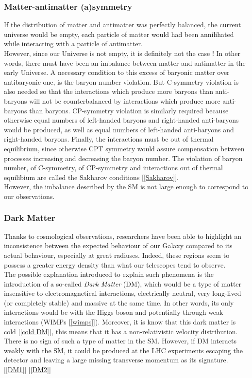 \documentclass [12pt] {article}
\numberwithin{equation}{section} %
\numberwithin{figure}{section}   %
\begin{document}
\subsubsection*{Matter-antimatter (a)symmetry}

If the distribution of matter and antimatter was perfectly balanced, the current universe would be empty, each particle of matter would had been annilihated while interacting with a particle of antimatter.\\ However, since our Universe is not empty, it is definitely not the case ! In other words, there must have been an imbalance between matter and antimatter in the early Universe. A necessary condition to this excess of baryonic matter over antibaryonic one, is the baryon number violation. But C-symmetry violation is also needed so that the interactions which produce more baryons than anti-baryons will not be counterbalanced by interactions which produce more anti-baryons than baryons. CP-symmetry violation is similarly required because otherwise equal numbers of left-handed baryons and right-handed anti-baryons would be produced, as well as equal numbers of left-handed anti-baryons and right-handed baryons. Finally, the interactions must be out of thermal equilibrium, since otherwise CPT symmetry would assure compensation between processes increasing and decreasing the baryon number. The violation of baryon number, of C-symmetry, of CP-symmetry and interactions out of thermal equilibium are called the Sakharov conditions [\ref{Sakharov}].\\
However, the imbalance described by the SM is not large enough to correspond to our observations.

\subsubsection*{Dark Matter}

Thanks to cosmological observations, researchers have been able to highlight an inconsistence between the expected behaviour of our Galaxy compared to its actual behaviour, especially at great radiuses. Indeed, these regions seem to possess a greater energy density than what our telescopes tend to observe.\\
The possible explanation introduced to explain such phenomena is the introduction of a so-called \textit{Dark Matter} (DM), which would be a type of matter insensitive to electromagnetical interactions, electrically neutral, very long-lived (or completely stable) and massive at the same time. In other words, its only interactions would be with the Higgs boson and potentially through weak interactions (WIMPs [\ref{wimps}]). Moreover, it is know that this dark matter is cold [\ref{cold DM}], this means that it has a non-relativistic velocity distribution.\\
There is no sign of such a type of matter in the SM. However, if DM interacts weakly with the SM, it could be produced at the LHC experiments escaping the detector and leaving a large missing transverse momentum as its signature. [\ref{DM1}] [\ref{DM2}]
\end{document}
